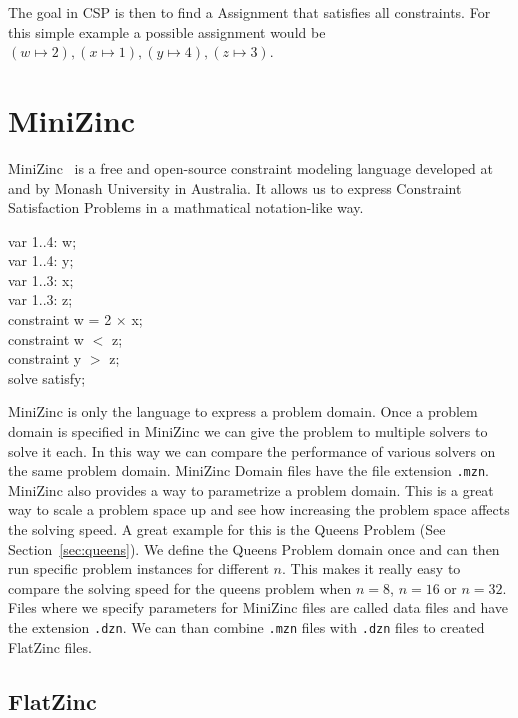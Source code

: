 The goal in CSP is then to find a Assignment that satisfies all constraints. For this simple example a possible assignment would be $(w \mapsto 2), (x \mapsto 1), (y \mapsto 4), (z \mapsto 3)$.

\section{MiniZinc}

MiniZinc~\cite{minizinc:2007} is a free and open-source constraint modeling language developed at and by Monash University in Australia. It allows us to express Constraint Satisfaction Problems in a mathmatical notation-like way.

\begin{tcolorbox}[title=MiniZinc example]
	var 1..4: w; \\
	var 1..4: y; \\
	var 1..3: x; \\
	var 1..3: z; \\

	constraint w = 2 $\times$ x; \\
	constraint w $<$ z; \\
	constraint y $>$ z; \\

	solve satisfy;
\end{tcolorbox}

MiniZinc is only the language to express a problem domain. Once a problem domain is specified in MiniZinc we can give the problem to multiple solvers to solve it each. In this way we can compare the performance of various solvers on the same problem domain. MiniZinc Domain files have the file extension \verb|.mzn|. \\

MiniZinc also provides a way to parametrize a problem domain. This is a great way to scale a problem space up and see how increasing the problem space affects the solving speed. A great example for this is the Queens Problem (See Section~\ref{sec:queens}). We define the Queens Problem domain once and can then run specific problem instances for different $n$. This makes it really easy to compare the solving speed for the queens problem when $n = 8$, $n = 16$ or $n = 32$. Files where we specify parameters for MiniZinc files are called data files and have the extension \verb|.dzn|. We can than combine \verb|.mzn| files with \verb|.dzn| files to created FlatZinc files.

\subsection{FlatZinc}

